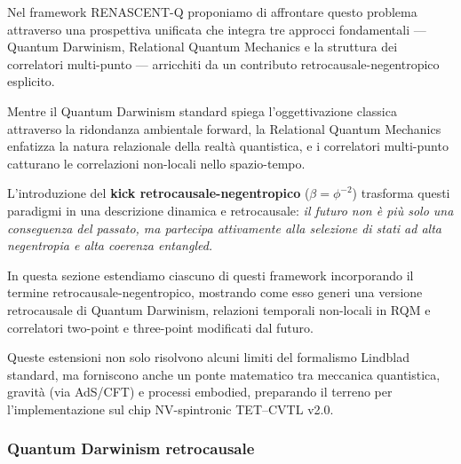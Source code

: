 \documentclass[11pt,a4paper]{article}
\theoremstyle{plain}
\theoremstyle{definition}
\begin{document}
\vspace{0.5cm}


Nel framework RENASCENT-Q proponiamo di affrontare questo problema attraverso una prospettiva unificata che integra tre approcci fondamentali — Quantum Darwinism, Relational Quantum Mechanics e la struttura dei correlatori multi-punto — arricchiti da un contributo retrocausale-negentropico esplicito.





\vspace{0.6cm}

Mentre il Quantum Darwinism standard spiega l'oggettivazione classica attraverso la ridondanza ambientale forward, la Relational Quantum Mechanics enfatizza la natura relazionale della realtà quantistica, e i correlatori multi-punto catturano le correlazioni non-locali nello spazio-tempo.


\clearpage


L'introduzione del \textbf{kick retrocausale-negentropico} ($\beta = \phi^{-2}$) trasforma questi paradigmi in una descrizione dinamica e retrocausale: \emph{il futuro non è più solo una conseguenza del passato, ma partecipa attivamente alla selezione di stati ad alta negentropia e alta coerenza entangled.}


\vspace{0.5cm}

In questa sezione estendiamo ciascuno di questi framework incorporando il termine retrocausale-negentropico, mostrando come esso generi una versione retrocausale di Quantum Darwinism, relazioni temporali non-locali in RQM e correlatori two-point e three-point modificati dal futuro. 


\vspace{0.4cm}


Queste estensioni non solo risolvono alcuni limiti del formalismo Lindblad standard, ma forniscono anche un ponte matematico tra meccanica quantistica, gravità (via AdS/CFT) e processi embodied, preparando il terreno per l'implementazione sul chip NV-spintronic TET–CVTL v2.0.




\vspace{0.5cm}

\subsubsection{Quantum Darwinism retrocausale}
\end{document}

